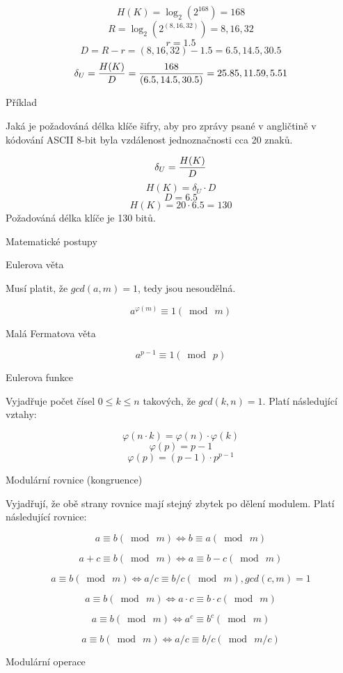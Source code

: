 $$H(K) = \log_{2}{(2^{168})} = 168$$
$$R = \log_{2}{( 2^{(8, 16, 32)} )} = 8, 16, 32$$
$$r = 1.5$$
$$D = R - r = (8, 16, 32) - 1.5 = 6.5, 14.5, 30.5$$
$$\delta_U = {H(K) \over D} = {168 \over (6.5, 14.5, 30.5)} = 25.85, 11.59, 5.51$$

\secc Příklad

Jaká je požadováná délka klíče šifry, aby pro zprávy psané v angličtině v kódování ASCII 8-bit byla vzdálenost jednoznačnosti cca 20 znaků.

$$\delta_U = {H(K) \over D}$$
$$H(K) = \delta_U \cdot D$$
$$D = 6.5$$
$$H(K) = 20 \cdot 6.5 = 130$$
\noindent
Požadováná délka klíče je 130 bitů.

\chap Matematické postupy

\sec Eulerova věta

Musí platit, že $gcd\left(a,m\right) = 1$, tedy jsou nesoudělná.

$$a^{\varphi\left( m \right)} \equiv 1\left(\bmod\ m\right)$$

\sec Malá Fermatova věta

$$a^{p - 1} \equiv 1\left(\bmod\ p\right)$$

\sec Eulerova funkce

Vyjadřuje počet čísel $0 \leq k \leq n$ takových, že $gcd(k,n) = 1$. Platí následující vztahy:

$$\varphi(n \cdot k) = \varphi(n) \cdot \varphi(k)$$
$$\varphi(p) = p - 1$$
$$\varphi(p) = (p - 1) \cdot p^{p-1}$$

\sec Modulární rovnice (kongruence)

Vyjadřují, že obě strany rovnice mají stejný zbytek po dělení modulem. Platí následující rovnice:

$$a \equiv b\left(\bmod\ m\right) \Leftrightarrow b \equiv a\left(\bmod\ m\right)$$

$$a + c\equiv b\left(\bmod\ m\right) \Leftrightarrow a \equiv b - c\left(\bmod\ m\right)$$

$$a\equiv b\left(\bmod\ m\right) \Leftrightarrow {a / c} \equiv {b / c}\left(\bmod\ m\right), gcd(c,m) = 1$$

$$a \equiv b\left(\bmod\ m\right) \Leftrightarrow a \cdot c \equiv b \cdot c \left(\bmod\ m\right)$$

$$a \equiv b\left(\bmod\ m\right) \Leftrightarrow a ^ c \equiv b ^ c \left(\bmod\ m\right)$$

$$a \equiv b\left(\bmod\ m\right) \Leftrightarrow a / c \equiv b / c \left(\bmod\ m / c\right)$$


\sec Modulární operace

